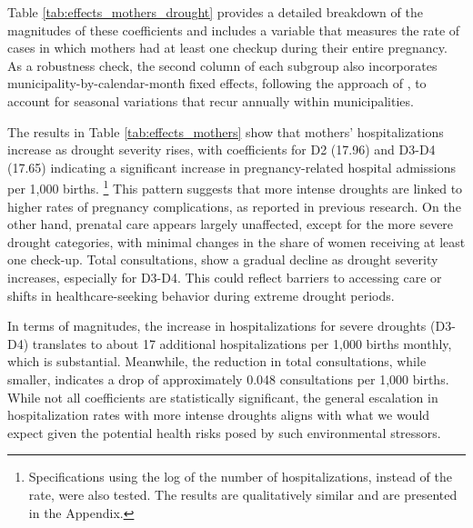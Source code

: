 \documentclass[12pt, oneside]{article}      %
\begin{document}
Table \ref{tab:effects_mothers_drought} provides a detailed breakdown of the magnitudes of these coefficients and includes a variable that measures the rate of cases in which mothers had at least one checkup during their entire pregnancy. As a robustness check, the second column of each subgroup also incorporates municipality-by-calendar-month fixed effects, following the approach of \cite{Cohen2022}, to account for seasonal variations that recur annually within municipalities.

The results in Table \ref{tab:effects_mothers} show that mothers' hospitalizations increase as drought severity rises, with coefficients for D2 (17.96) and D3-D4 (17.65) indicating a significant increase in pregnancy-related hospital admissions per 1,000 births. \footnote{Specifications using the log of the number of hospitalizations, instead of the rate, were also tested. The results are qualitatively similar and are presented in the Appendix.} This pattern suggests that more intense droughts are linked to higher rates of pregnancy complications, as reported in previous research. On the other hand, prenatal care appears largely unaffected, except for the more severe drought categories, with minimal changes in the share of women receiving at least one check-up. Total consultations, show a gradual decline as drought severity increases, especially for D3-D4. This could reflect barriers to accessing care or shifts in healthcare-seeking behavior during extreme drought periods.

In terms of magnitudes, the increase in hospitalizations for severe droughts (D3-D4) translates to about 17 additional hospitalizations per 1,000 births monthly, which is substantial. Meanwhile, the reduction in total consultations, while smaller, indicates a drop of approximately 0.048 consultations per 1,000 births. While not all coefficients are statistically significant, the general escalation in hospitalization rates with more intense droughts aligns with what we would expect given the potential health risks posed by such environmental stressors.
\end{document}
